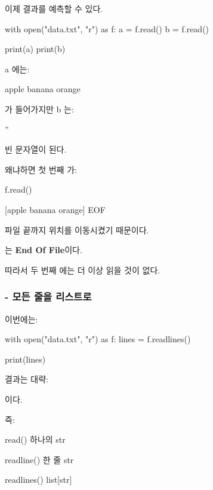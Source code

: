 이제 결과를 예측할 수 있다.

\begin{dhkcode}
with open("data.txt", "r") as f:
    a = f.read()
    b = f.read()

print(a)
print(b)
\end{dhkcode}

a 에는:

\begin{dhkzsh}
apple
banana
orange
\end{dhkzsh}

가 들어가지만 b 는:

\begin{dhkcode}
''
\end{dhkcode}

빈 문자열이 된다.

왜냐하면 첫 번째 가:

\begin{dhksmry}
    \ua

    f.read()

    [apple banana orange]
                        \ua
                        EOF
\end{dhksmry}

파일 끝까지 위치를 이동시켰기 때문이다.

는 \textbf{End Of File}이다.

따라서 두 번째 에는 더 이상 읽을 것이 없다.

\subsubsection{ - 모든 줄을 리스트로}

이번에는:

\begin{dhkcode}
with open("data.txt", "r") as f:
    lines = f.readlines()

print(lines)
\end{dhkcode}

결과는 대략:

\begin{dhkzsh}
\end{dhkzsh}

이다.

즉:

\begin{dhksmry}[centered]
read()
\da
{}
하나의 str


readline()
\da
{}
한 줄 str


readlines()
\da
{}
list[str]
\end{dhksmry}


